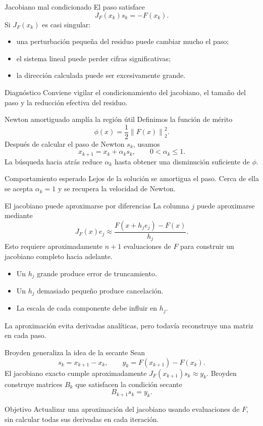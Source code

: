 \documentclass[aspectratio=169,12pt]{beamer}
\newcommand{\norm}[1]{\left\lVert#1\right\rVert}
\begin{document}
\begin{frame}{Jacobiano mal condicionado}
El paso satisface
\[
J_F(x_k)s_k=-F(x_k).
\]
Si $J_F(x_k)$ es casi singular:
\begin{itemize}
  \item una perturbación pequeña del residuo puede cambiar mucho el paso;
  \item el sistema lineal puede perder cifras significativas;
  \item la dirección calculada puede ser excesivamente grande.
\end{itemize}
\begin{block}{Diagnóstico}
Conviene vigilar el condicionamiento del jacobiano, el tamaño del paso y la
reducción efectiva del residuo.
\end{block}
\end{frame}

\begin{frame}{Newton amortiguado amplía la región útil}
Definimos la función de mérito
\[
\phi(x)=\frac12\norm{F(x)}_2^2.
\]
Después de calcular el paso de Newton $s_k$, usamos
\[
x_{k+1}=x_k+\alpha_k s_k,
\qquad 0<\alpha_k\leq1.
\]
La búsqueda hacia atrás reduce $\alpha_k$ hasta obtener una disminución
suficiente de $\phi$.
\begin{block}{Comportamiento esperado}
Lejos de la solución se amortigua el paso. Cerca de ella se acepta $\alpha_k=1$
y se recupera la velocidad de Newton.
\end{block}
\end{frame}

\begin{frame}{El jacobiano puede aproximarse por diferencias}
La columna $j$ puede aproximarse mediante
\[
J_F(x)e_j\approx
\frac{F(x+h_j e_j)-F(x)}{h_j}.
\]
Esto requiere aproximadamente $n+1$ evaluaciones de $F$ para construir un
jacobiano completo hacia adelante.
\begin{itemize}
  \item Un $h_j$ grande produce error de truncamiento.
  \item Un $h_j$ demasiado pequeño produce cancelación.
  \item La escala de cada componente debe influir en $h_j$.
\end{itemize}
La aproximación evita derivadas analíticas, pero todavía reconstruye una matriz en cada paso.
\end{frame}

\begin{frame}{Broyden generaliza la idea de la secante}
Sean
\[
s_k=x_{k+1}-x_k,
\qquad
y_k=F(x_{k+1})-F(x_k).
\]
El jacobiano exacto cumple aproximadamente $J_F(x_{k+1})s_k\approx y_k$.
Broyden construye matrices $B_k$ que satisfacen la condición secante
\[
B_{k+1}s_k=y_k.
\]
\begin{block}{Objetivo}
Actualizar una aproximación del jacobiano usando evaluaciones de $F$, sin
calcular todas sus derivadas en cada iteración.
\end{block}
\end{frame}
\end{document}
